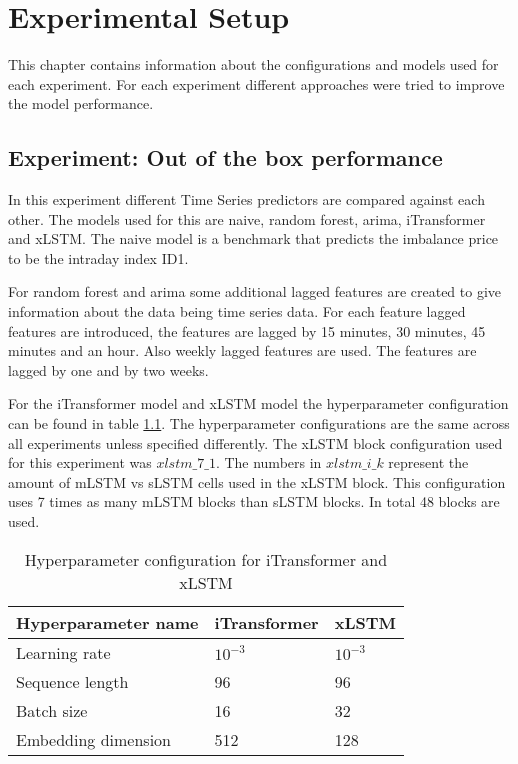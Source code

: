 \documentclass[class=scrbook, crop=false]{standalone}
\begin{document}
\chapter{Experimental Setup} %
\label{Chapter::Experimental_Setup}
   This chapter contains information about the configurations and models used for each experiment. 
   For each experiment different approaches were tried to improve the model performance.

\section{Experiment: Out of the box performance}
\label{Section::Experiment_out_of_the_box}

In this experiment different Time Series predictors are compared against each other.
The models used for this are naive, random forest, arima, iTransformer and xLSTM.
The naive model is a benchmark that predicts the imbalance price to be the intraday index ID1. 

For random forest and arima some additional lagged features are created to give information about the data being time series data.
For each feature lagged features are introduced, the features are lagged by 15 minutes, 30 minutes, 45 minutes and an hour.
Also weekly lagged features are used. 
The features are lagged by one and by two weeks.

For the iTransformer model and xLSTM model the hyperparameter configuration can be found in table \ref{Table::Raw_hyperparameters}.
The hyperparameter configurations are the same across all experiments unless specified differently.
The xLSTM block configuration used for this experiment was $xlstm\_7\_1$. 
The numbers in $xlstm\_i\_k$ represent the amount of mLSTM vs sLSTM cells used in the xLSTM block.
This configuration uses 7 times as many mLSTM blocks than sLSTM blocks. 
In total 48 blocks are used. 

\begin{table}[]
\centering
\begin{tabular}{l|l|l}
 Hyperparameter name & iTransformer & xLSTM   \\\hline
 Learning rate & $10^{-3}$ & $10^{-3} $ \\
 Sequence length & 96 & 96  \\
 Batch size & 16 & 32  \\
 Embedding dimension & 512 & 128  \\
 
\end{tabular}
\caption{Hyperparameter configuration for iTransformer and xLSTM}
\label{Table::Raw_hyperparameters}
\end{table}
\end{document}

